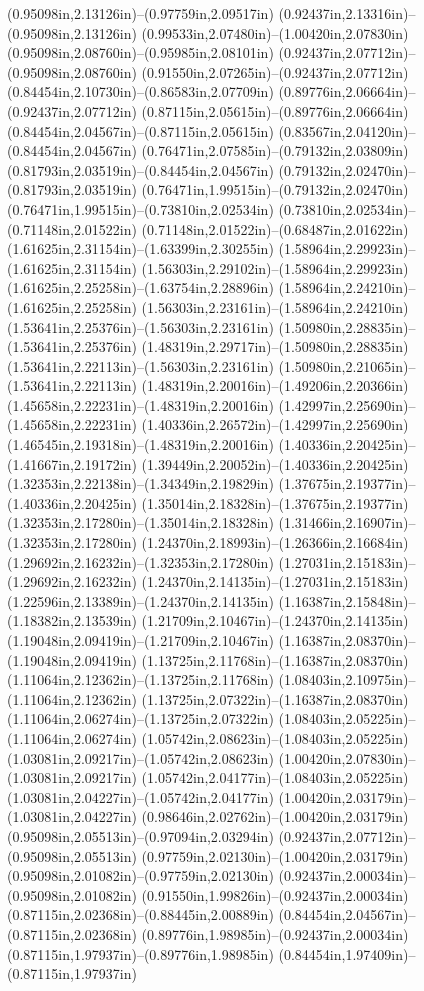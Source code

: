 (0.95098in,2.13126in)--(0.97759in,2.09517in) (0.92437in,2.13316in)--(0.95098in,2.13126in) (0.99533in,2.07480in)--(1.00420in,2.07830in) (0.95098in,2.08760in)--(0.95985in,2.08101in) (0.92437in,2.07712in)--(0.95098in,2.08760in) (0.91550in,2.07265in)--(0.92437in,2.07712in) (0.84454in,2.10730in)--(0.86583in,2.07709in) (0.89776in,2.06664in)--(0.92437in,2.07712in) (0.87115in,2.05615in)--(0.89776in,2.06664in) (0.84454in,2.04567in)--(0.87115in,2.05615in) (0.83567in,2.04120in)--(0.84454in,2.04567in) (0.76471in,2.07585in)--(0.79132in,2.03809in) (0.81793in,2.03519in)--(0.84454in,2.04567in) (0.79132in,2.02470in)--(0.81793in,2.03519in) (0.76471in,1.99515in)--(0.79132in,2.02470in) (0.76471in,1.99515in)--(0.73810in,2.02534in) (0.73810in,2.02534in)--(0.71148in,2.01522in) (0.71148in,2.01522in)--(0.68487in,2.01622in) (1.61625in,2.31154in)--(1.63399in,2.30255in) (1.58964in,2.29923in)--(1.61625in,2.31154in) (1.56303in,2.29102in)--(1.58964in,2.29923in) (1.61625in,2.25258in)--(1.63754in,2.28896in) (1.58964in,2.24210in)--(1.61625in,2.25258in) (1.56303in,2.23161in)--(1.58964in,2.24210in) (1.53641in,2.25376in)--(1.56303in,2.23161in) (1.50980in,2.28835in)--(1.53641in,2.25376in) (1.48319in,2.29717in)--(1.50980in,2.28835in) (1.53641in,2.22113in)--(1.56303in,2.23161in) (1.50980in,2.21065in)--(1.53641in,2.22113in) (1.48319in,2.20016in)--(1.49206in,2.20366in) (1.45658in,2.22231in)--(1.48319in,2.20016in) (1.42997in,2.25690in)--(1.45658in,2.22231in) (1.40336in,2.26572in)--(1.42997in,2.25690in) (1.46545in,2.19318in)--(1.48319in,2.20016in) (1.40336in,2.20425in)--(1.41667in,2.19172in) (1.39449in,2.20052in)--(1.40336in,2.20425in) (1.32353in,2.22138in)--(1.34349in,2.19829in) (1.37675in,2.19377in)--(1.40336in,2.20425in) (1.35014in,2.18328in)--(1.37675in,2.19377in) (1.32353in,2.17280in)--(1.35014in,2.18328in) (1.31466in,2.16907in)--(1.32353in,2.17280in) (1.24370in,2.18993in)--(1.26366in,2.16684in) (1.29692in,2.16232in)--(1.32353in,2.17280in) (1.27031in,2.15183in)--(1.29692in,2.16232in) (1.24370in,2.14135in)--(1.27031in,2.15183in) (1.22596in,2.13389in)--(1.24370in,2.14135in) (1.16387in,2.15848in)--(1.18382in,2.13539in) (1.21709in,2.10467in)--(1.24370in,2.14135in) (1.19048in,2.09419in)--(1.21709in,2.10467in) (1.16387in,2.08370in)--(1.19048in,2.09419in) (1.13725in,2.11768in)--(1.16387in,2.08370in) (1.11064in,2.12362in)--(1.13725in,2.11768in) (1.08403in,2.10975in)--(1.11064in,2.12362in) (1.13725in,2.07322in)--(1.16387in,2.08370in) (1.11064in,2.06274in)--(1.13725in,2.07322in) (1.08403in,2.05225in)--(1.11064in,2.06274in) (1.05742in,2.08623in)--(1.08403in,2.05225in) (1.03081in,2.09217in)--(1.05742in,2.08623in) (1.00420in,2.07830in)--(1.03081in,2.09217in) (1.05742in,2.04177in)--(1.08403in,2.05225in) (1.03081in,2.04227in)--(1.05742in,2.04177in) (1.00420in,2.03179in)--(1.03081in,2.04227in) (0.98646in,2.02762in)--(1.00420in,2.03179in) (0.95098in,2.05513in)--(0.97094in,2.03294in) (0.92437in,2.07712in)--(0.95098in,2.05513in) (0.97759in,2.02130in)--(1.00420in,2.03179in) (0.95098in,2.01082in)--(0.97759in,2.02130in) (0.92437in,2.00034in)--(0.95098in,2.01082in) (0.91550in,1.99826in)--(0.92437in,2.00034in) (0.87115in,2.02368in)--(0.88445in,2.00889in) (0.84454in,2.04567in)--(0.87115in,2.02368in) (0.89776in,1.98985in)--(0.92437in,2.00034in) (0.87115in,1.97937in)--(0.89776in,1.98985in) (0.84454in,1.97409in)--(0.87115in,1.97937in) 